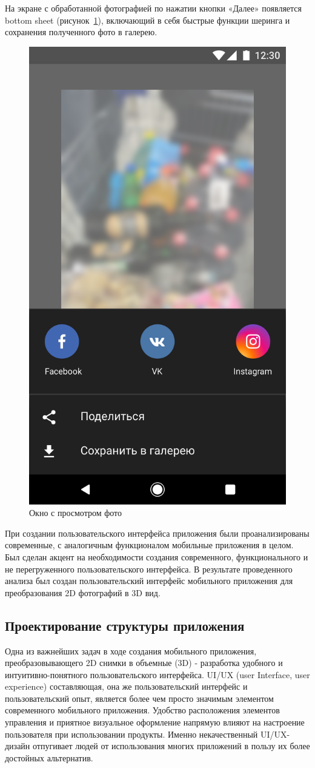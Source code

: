 На экране с обработанной фотографией по нажатии кнопки «Далее» появляется bottom sheet (рисунок~\ref{fig:Artboard2}), включающий в себя быстрые функции шеринга и сохранения полученного фото в галерею.

\begin{figure}[H]
	\centering
	\includegraphics[width=0.6\linewidth]{pics/Artboard2}
	\caption{Окно с просмотром фото}
	\label{fig:Artboard2}
\end{figure}

При создании пользовательского интерфейса приложения были проанализированы современные, с аналогичным функционалом мобильные приложения в целом. Был сделан акцент на необходимости создания современного, функционального и не перегруженного пользовательского интерфейса. В результате проведенного анализа был создан пользовательский интерфейс мобильного приложения для преобразования 2D фотографий в 3D вид.


\subsection{Проектирование структуры приложения}

Одна из важнейших задач в ходе создания мобильного приложения, преобразовывающего 2D снимки в объемные (3D) - разработка удобного и интуитивно-понятного пользовательского интерфейса. UI/UX (user Interface, user experience) составляющая, она же пользовательский интерфейс и пользовательский опыт, является более чем просто значимым элементом современного мобильного приложения. Удобство расположения элементов управления и приятное визуальное оформление напрямую влияют на настроение пользователя при использовании продукты. Именно некачественный UI/UX-дизайн отпугивает людей от использования многих приложений в пользу их более достойных альтернатив.

